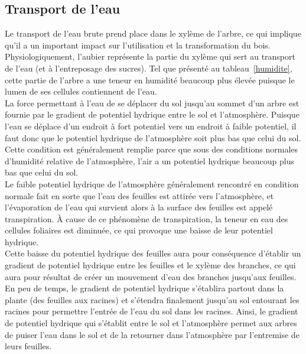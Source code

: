 \subsection{Transport de l'eau}\label{eau}

Le transport de l'eau brute prend place dans le xylème de l'arbre, ce qui implique qu'il a un important impact sur l'utilisation et la transformation du bois. Physiologiquement, l'aubier représente la partie du xylème qui sert au transport de l'eau (et à l'entreposage des sucres). Tel que présenté au tableau~\ref{humidite}, cette partie de l'arbre a une teneur en humidité beaucoup plus élevée puisque le lumen de ses cellules contiennent de l'eau.\\ 

La force permettant à l'eau de se déplacer du sol jusqu'au sommet d'un arbre est fournie par le gradient de potentiel hydrique entre le sol et l'atmosphère. Puisque l'eau se déplace d'un endroit à fort potentiel vers un endroit à faible potentiel, il faut donc que le potentiel hydrique de l'atmosphère soit plus bas que celui du sol. Cette condition est généralement remplie parce que sous des conditions normales d'humidité relative de l'atmosphère, l'air a un potentiel hydrique beaucoup plus bas que celui du sol. \\

Le faible potentiel hydrique de l'atmosphère généralement rencontré en condition normale fait en sorte que l'eau des feuilles est attirée vers l'atmosphère, et l'évaporation de l'eau qui survient alors à la surface des feuilles est appelé transpiration. À cause de ce phénomène de transpiration, la teneur en eau des cellules foliaires est diminuée, ce qui provoque une baisse de leur potentiel hydrique.\\  

Cette baisse du potentiel hydrique des feuilles aura pour conséquence d'établir un gradient de potentiel hydrique entre les feuilles et le xylème des branches, ce qui aura pour résultat de créer un mouvement d'eau des branches jusqu'aux feuilles.\\ 

En peu de temps, le gradient de potentiel hydrique s'établira partout dans la plante (des feuilles aux racines) et s'étendra finalement jusqu'au sol entourant les racines pour permettre l'entrée de l'eau du sol dans les racines. Ainsi, le gradient de potentiel hydrique qui s'établit entre le sol et l'atmosphère permet aux arbres de puiser l'eau dans le sol et de la retourner dans l'atmosphère par l'entremise de leurs feuilles.\\

